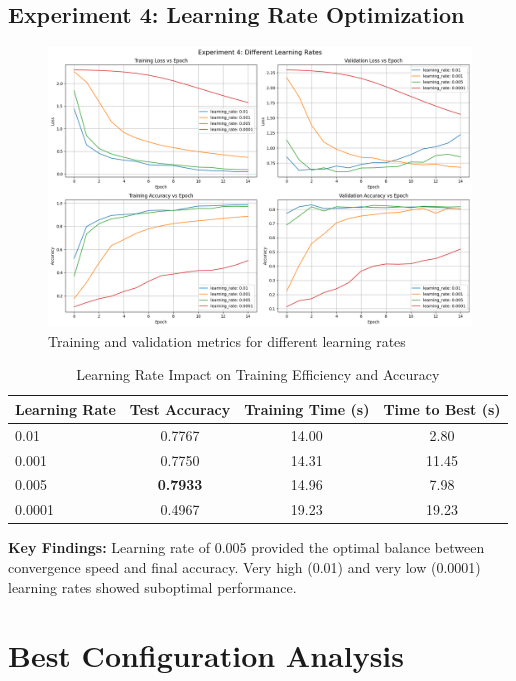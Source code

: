 \documentclass[11pt,a4paper]{article}
\begin{document}
\subsection{Experiment 4: Learning Rate Optimization}
\begin{figure}[H]
\centering
\includegraphics[width=\textwidth]{e4.png}
\caption{Training and validation metrics for different learning rates}
\label{fig:experiment4}
\end{figure}

\begin{table}[H]
\centering
\caption{Learning Rate Impact on Training Efficiency and Accuracy}
\begin{tabular}{@{}lccc@{}}
\toprule
\textbf{Learning Rate} & \textbf{Test Accuracy} & \textbf{Training Time (s)} & \textbf{Time to Best (s)} \\
\midrule
0.01 & 0.7767 & 14.00 & 2.80 \\
0.001 & 0.7750 & 14.31 & 11.45 \\
0.005 & \textbf{0.7933} & 14.96 & 7.98 \\
0.0001 & 0.4967 & 19.23 & 19.23 \\
\bottomrule
\end{tabular}
\end{table}

\textbf{Key Findings:} Learning rate of 0.005 provided the optimal balance between convergence speed and final accuracy. Very high (0.01) and very low (0.0001) learning rates showed suboptimal performance.

\section{Best Configuration Analysis}
\end{document}
